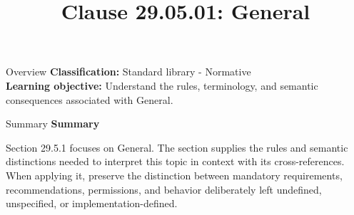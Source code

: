 \documentclass[10pt,letterpaper]{article}
\title{Clause 29.05.01: General}
\author{}
\date{}
\begin{document}
\maketitle
\begin{CornellOverviewBox}{Overview}
\textbf{Classification:} Standard library - Normative\\[2pt]
\textbf{Learning objective:} Understand the rules, terminology, and semantic consequences associated with General.
\end{CornellOverviewBox}\begin{CornellSummaryBox}{Summary}
{\sffamily\bfseries\color{Accent} Summary}\par\vspace{3pt}Section 29.5.1 focuses on General. The section supplies the rules and semantic distinctions needed to interpret this topic in context with its cross-references. When applying it, preserve the distinction between mandatory requirements, recommendations, permissions, and behavior deliberately left undefined, unspecified, or implementation-defined.
\end{CornellSummaryBox}
\end{document}
